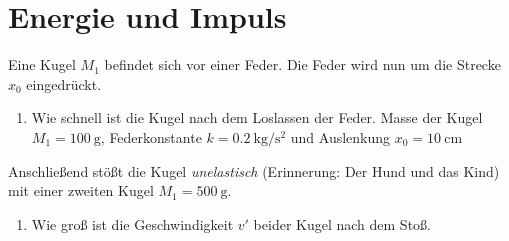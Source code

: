 \section{Energie und Impuls}
Eine Kugel $M_1$ befindet sich vor einer Feder.
Die Feder wird nun um die Strecke $x_0$ eingedrückt.
\begin{enumerate}
\item{ Wie schnell ist die Kugel nach dem Loslassen der Feder. Masse der Kugel $M_1=\SI{100}{\gram}$,
Federkonstante $k=\SI{0.2}{\kilo\gram\per\square\second}$ und Auslenkung $x_0=\SI{10}{\centi\meter}$}
\end{enumerate}
Anschließend stößt die Kugel \emph{unelastisch} (Erinnerung: Der Hund und das Kind) mit einer zweiten Kugel $M_1=\SI{500}{\gram}$.
\begin{enumerate}
\item {Wie groß ist die Geschwindigkeit $v'$ beider Kugel nach dem Stoß.}
\end{enumerate}
